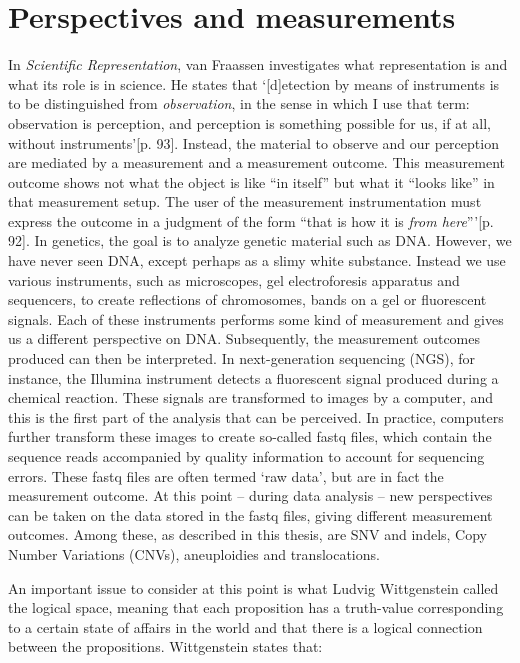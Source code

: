 \section{Perspectives and measurements} \label{Perspectives}
In \textsl{Scientific Representation}, van Fraassen investigates what representation is and what its role is in science. 
He states that ‘[d]etection by means of instruments is to be distinguished from \textsl{observation}, in the sense in which I use that term: observation is perception, and perception is something possible for us, if at all, without instruments’[p. 93]. 
Instead, the material to observe and our perception are mediated by a measurement and a measurement outcome. 
This measurement outcome shows not what the object is like “in itself” but what it “looks like” in that measurement setup. 
The user of the measurement instrumentation must express the outcome in a judgment of the form “that is how it is \textsl{from here}”’[p. 92]. 
In genetics, the goal is to analyze genetic material such as DNA. 
However, we have never seen DNA, except perhaps as a slimy white substance. 
Instead we use various instruments, such as microscopes, gel electroforesis apparatus and sequencers, to create reflections of chromosomes, bands on a gel or fluorescent signals. 
Each of these instruments performs some kind of measurement and gives us a different perspective on DNA. 
Subsequently, the measurement outcomes produced can then be interpreted. 
In next-generation sequencing (NGS), for instance, the Illumina instrument detects a fluorescent signal produced during a chemical reaction. 
These signals are transformed to images by a computer, and this is the first part of the analysis that can be perceived. 
In practice, computers further transform these images to create so-called fastq files, which contain the sequence reads accompanied by quality information to account for sequencing errors. 
These fastq files are often termed ‘raw data’, but are in fact the measurement outcome. 
At this point – during data analysis – new perspectives can be taken on the data stored in the fastq files, giving different measurement outcomes.
Among these, as described in this thesis, are SNV and indels, Copy Number Variations (CNVs), aneuploidies and translocations. 

An important issue to consider at this point is what Ludvig Wittgenstein called the logical space, meaning that each proposition has a truth-value corresponding to a certain state of affairs in the world and that there is a logical connection between the propositions. 
Wittgenstein states that: \newline


